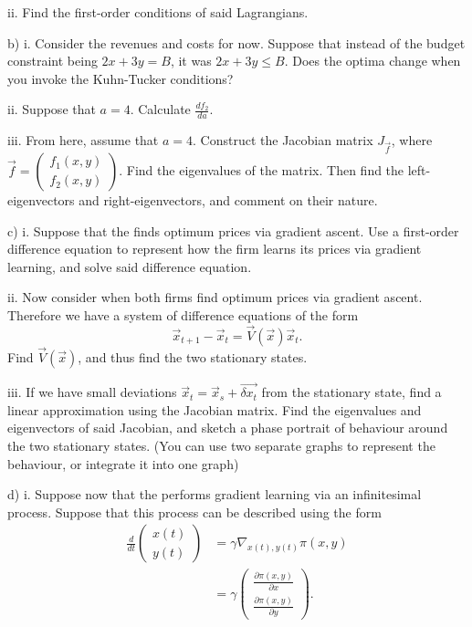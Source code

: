 \documentclass[a4paper, 12pt,oneside,openany]{book}
\begin{document}
ii. Find the first-order conditions of said Lagrangians.

b) i. Consider the  revenues and costs for now. Suppose that instead of the budget constraint being $2x+3y =B$, it was $2x+3y \leq B$. Does the optima change when you invoke the Kuhn-Tucker conditions?

ii. Suppose that $a=4.$ Calculate $\frac{df_2}{da}$. 

iii. From here, assume that $a=4.$ Construct the Jacobian matrix $J_{\vec{f}}$, where $\vec{f} = \begin{pmatrix} f_1(x, y) \\ f_2(x, y) \end{pmatrix}$. Find the eigenvalues of the matrix. Then find the left-eigenvectors and right-eigenvectors, and comment on their nature.

c) i. Suppose that the  finds optimum prices via gradient ascent. Use a first-order difference equation to represent how the firm learns its prices via gradient learning, and solve said difference equation.

ii. Now consider when both firms find optimum prices via gradient ascent. Therefore we have a system of difference equations of the form $$\vec{x}_{t+1}-\vec{x}_t = \vec{V}(\vec{x}) \vec{x}_t.$$ Find $\vec{V}(\vec{x})$, and thus find the two stationary states.

iii. If we have small deviations $\vec{x}_t = \vec{x}_s + \vec{\delta x_t}$ from the stationary state, find a linear approximation using the Jacobian matrix. Find the eigenvalues and eigenvectors of said Jacobian, and sketch a phase portrait of behaviour around the two stationary states. (You can use two separate graphs to represent the behaviour, or integrate it into one graph)

d) i. Suppose now that the  performs gradient learning via an infinitesimal process. Suppose that this process can be described using the form \begin{align*} \frac{d}{dt} \begin{pmatrix} x(t) \\ y(t) \end{pmatrix} &= \gamma \nabla_{x(t), y(t)} \pi(x, y) \\ &= \gamma \begin{pmatrix} \frac{\partial \pi(x, y)}{\partial x} \\ \frac{\partial \pi(x, y)}{\partial y} \end{pmatrix}.\end{align*}
\end{document}
